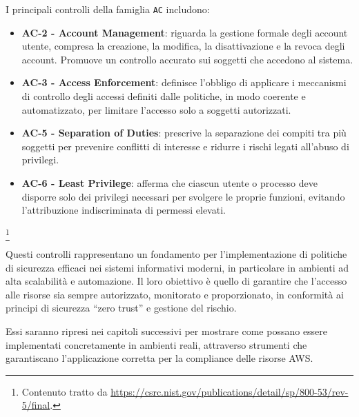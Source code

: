 I principali controlli della famiglia \texttt{AC} includono:

\begin{itemize}
    \item \textbf{AC-2 - Account Management}: riguarda la gestione formale degli account utente, compresa la creazione, la modifica, la disattivazione e la revoca degli account. Promuove un controllo accurato sui soggetti che accedono al sistema.

    \item \textbf{AC-3 - Access Enforcement}: definisce l'obbligo di applicare i meccanismi di controllo degli accessi definiti dalle politiche, in modo coerente e automatizzato, per limitare l'accesso solo a soggetti autorizzati.

    \item \textbf{AC-5 - Separation of Duties}: prescrive la separazione dei compiti tra più soggetti per prevenire conflitti di interesse e ridurre i rischi legati all'abuso di privilegi.

    \item \textbf{AC-6 - Least Privilege}: afferma che ciascun utente o processo deve disporre solo dei privilegi necessari per svolgere le proprie funzioni, evitando l'attribuzione indiscriminata di permessi elevati.
\end{itemize}

\footnote{Contenuto tratto da \url{https://csrc.nist.gov/publications/detail/sp/800-53/rev-5/final}.}

Questi controlli rappresentano un fondamento per l'implementazione di politiche di sicurezza efficaci nei sistemi informativi moderni, in particolare in ambienti ad alta scalabilità e automazione. Il loro obiettivo è quello di garantire che l'accesso alle risorse sia sempre autorizzato, monitorato e proporzionato, in conformità ai principi di sicurezza “zero trust” e gestione del rischio.

Essi saranno ripresi nei capitoli successivi per mostrare come possano essere implementati concretamente in ambienti reali, attraverso strumenti che garantiscano l'applicazione corretta per la compliance delle risorse AWS.

